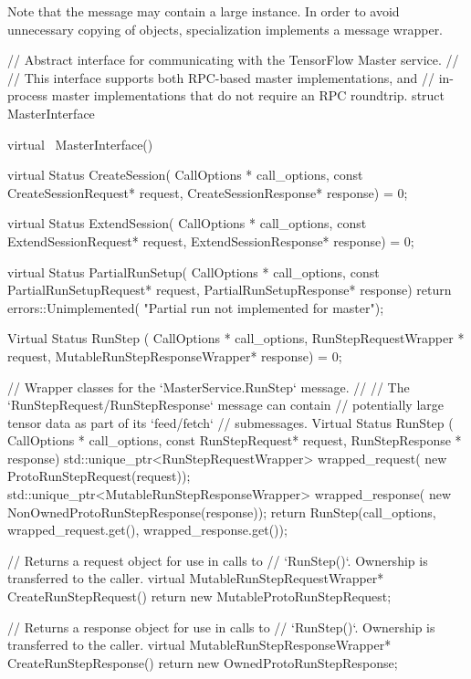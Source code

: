\begin{content}
Note that the  message may contain a large  instance. In order to avoid unnecessary copying of objects, specialization implements a message wrapper.

\begin{leftbar}
\begin{c++}
// Abstract interface for communicating with the TensorFlow Master service.
//
// This interface supports both RPC-based master implementations, and
// in-process master implementations that do not require an RPC roundtrip.
struct MasterInterface {
  virtual ~MasterInterface() {}
  
  virtual Status CreateSession(
      CallOptions * call_options,
      const CreateSessionRequest* request,
      CreateSessionResponse* response) = 0;

  virtual Status ExtendSession(
      CallOptions * call_options,
      const ExtendSessionRequest* request,
      ExtendSessionResponse* response) = 0;

  virtual Status PartialRunSetup(
      CallOptions * call_options,
      const PartialRunSetupRequest* request,
      PartialRunSetupResponse* response) {
    return errors::Unimplemented(
      "Partial run not implemented for master");
  }

  Virtual Status RunStep (
      CallOptions * call_options,
      RunStepRequestWrapper * request,
      MutableRunStepResponseWrapper* response) = 0;

  // Wrapper classes for the `MasterService.RunStep` message.
  //
  // The `RunStepRequest/RunStepResponse` message can contain 
  // potentially large tensor data as part of its `feed/fetch` 
  // submessages.
  Virtual Status RunStep (
    CallOptions * call_options,
    const RunStepRequest* request,
    RunStepResponse * response) {
    std::unique_ptr<RunStepRequestWrapper> wrapped_request(
        new ProtoRunStepRequest(request));
    std::unique_ptr<MutableRunStepResponseWrapper> wrapped_response(
        new NonOwnedProtoRunStepResponse(response));
    return RunStep(call_options, 
        wrapped_request.get(), 
        wrapped_response.get());
  }

  // Returns a request object for use in calls to
  // `RunStep()`. Ownership is transferred to the caller.
  virtual MutableRunStepRequestWrapper* CreateRunStepRequest() {
    return new MutableProtoRunStepRequest;
  }

  // Returns a response object for use in calls to
  // `RunStep()`. Ownership is transferred to the caller.
  virtual MutableRunStepResponseWrapper* CreateRunStepResponse() {
    return new OwnedProtoRunStepResponse;
  }

}
\end{c++}
\end{leftbar}
\end{content}
